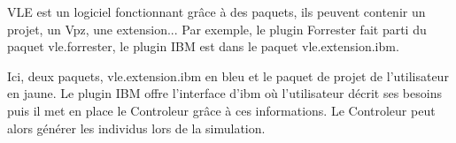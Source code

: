 VLE est un logiciel fonctionnant grâce à des paquets, ils peuvent contenir un projet, un Vpz, une extension... Par exemple, le plugin Forrester fait parti du paquet vle.forrester, le plugin IBM est dans le paquet vle.extension.ibm.\\

\noindent\begin{minipage}{\linewidth}%
\end{minipage}

Ici, deux paquets, vle.extension.ibm en bleu et le paquet de projet de l'utilisateur en jaune. Le plugin IBM offre l'interface d'ibm où l'utilisateur décrit ses besoins puis il met en place le Controleur grâce à ces informations. Le Controleur peut alors générer les individus lors de la simulation.

